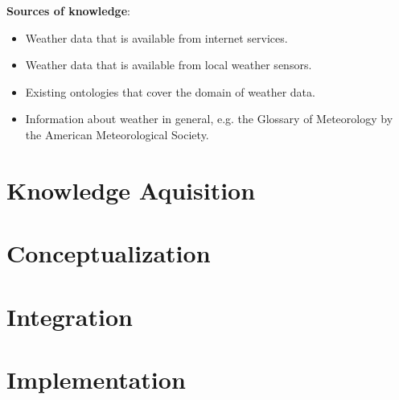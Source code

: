 \begin{mdframed}
\vspace{.2cm}

\textbf{Sources of knowledge}: %
\begin{itemize}
  \item Weather data that is available from internet services.
  \item Weather data that is available from local weather sensors.
  \item Existing ontologies that cover the domain of weather data.
  \item Information about weather in general, e.g. the Glossary of Meteorology by the American Meteorological Society. %
\end{itemize}

\end{mdframed}


\section{Knowledge Aquisition}


\section{Conceptualization}



\section{Integration}


\section{Implementation}

